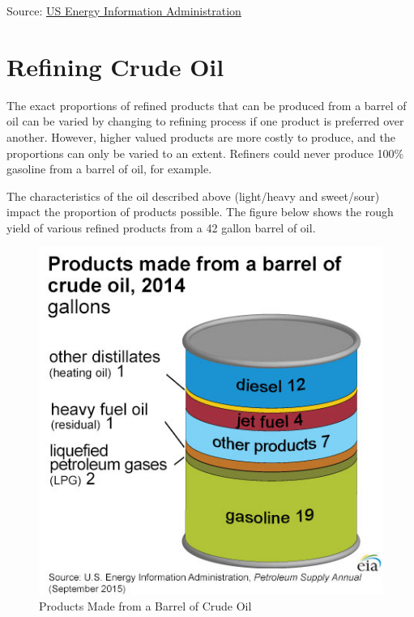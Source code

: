 \documentclass[
  letterpaper,
  DIV=11,
  numbers=noendperiod]{scrreprt}
\begin{document}
Source:
\href{http://www.eia.gov/Energyexplained/index.cfm?page=oil_home}{US
Energy Information Administration}

\hypertarget{refining-crude-oil}{%
\section{Refining Crude Oil}\label{refining-crude-oil}}

The exact proportions of refined products that can be produced from a
barrel of oil can be varied by changing to refining process if one
product is preferred over another. However, higher valued products are
more costly to produce, and the proportions can only be varied to an
extent. Refiners could never produce 100\% gasoline from a barrel of
oil, for example.

The characteristics of the oil described above (light/heavy and
sweet/sour) impact the proportion of products possible. The figure below
shows the rough yield of various refined products from a 42 gallon
barrel of oil.

\begin{figure}

{\centering \includegraphics{images/products_from_barrel_crude_oil-large.jpg}

}

\caption{Products Made from a Barrel of Crude Oil}

\end{figure}
\end{document}
